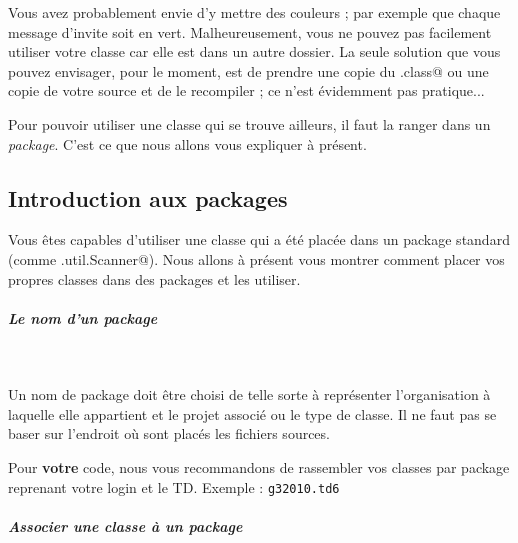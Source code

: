 \documentclass[a4paper,11pt]{article}
\begin{document}
		Vous avez probablement envie d'y mettre des couleurs ; par exemple que chaque message d'invite soit en vert.
		Malheureusement, vous ne pouvez pas facilement utiliser votre classe \verb@Color@ car elle est dans un autre dossier.
		La seule solution que vous pouvez envisager, pour le moment, est de prendre une copie du \verb@.class@ ou une copie de votre source
		et de le recompiler ; ce n'est \'evidemment pas pratique...
			
            \par
        
			
		Pour pouvoir utiliser une classe qui se trouve ailleurs, il faut la ranger dans un \textit{package}.
		C'est ce que nous allons vous expliquer \`a pr\'esent.
		
			
            \par
	
 	 \subsection{Introduction aux packages}
		Vous \^etes capables d'utiliser une classe qui a \'et\'e plac\'ee dans un package standard 
		(comme \verb@java.util.Scanner@). Nous allons \`a pr\'esent vous montrer
		comment placer vos propres classes dans des packages et les utiliser.
			
            \par
        
			
		\subparagraph{Le nom d'un package} 
		
				\textcolor{white}{.} 
				
				Un nom de package doit \^etre choisi de telle sorte \`a repr\'esenter l'organisation \`a laquelle elle
				appartient et le projet associ\'e ou le type de classe. Il ne faut pas se baser sur l'endroit o\`u sont plac\'es 
				les fichiers sources.
			
            \par
        
				Pour \textbf{votre} code, nous vous recommandons de rassembler vos classes par package reprenant votre login et le TD.
				Exemple : \verb|g32010.td6|
			
            \par
        
			
		\subparagraph{Associer une classe \`a un package} 
		
\end{document}
